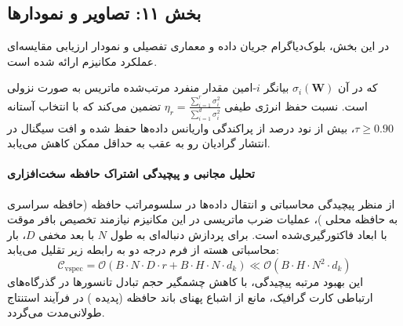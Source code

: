 \begin{center}
\end{center}

\subsection*{بخش ۱۱: تصاویر و نمودارها }
در این بخش، بلوک‌دیاگرام جریان داده و معماری تفصیلی و نمودار ارزیابی مقایسه‌ای عملکرد مکانیزم  ارائه شده است.



که در آن $\sigma_i(\mathbf{W})$ بیانگر $i$-امین مقدار منفرد مرتب‌شده ماتریس به صورت نزولی است. نسبت حفظ انرژی طیفی $\eta_r = \frac{\sum_{i=1}^r \sigma_i^2}{\sum_{i=1}^{d} \sigma_i^2}$ تضمین می‌کند که با انتخاب آستانه $\tau \ge 0.90$، بیش از نود درصد از پراکندگی واریانس داده‌ها حفظ شده و افت سیگنال در انتشار گرادیان رو به عقب به حداقل ممکن کاهش می‌یابد.

\paragraph{تحلیل مجانبی و پیچیدگی اشتراک حافظه سخت‌افزاری}
از منظر پیچیدگی محاسباتی و انتقال داده‌ها در سلسومراتب حافظه (حافظه سراسری  به حافظه محلی )، عملیات ضرب ماتریسی در این مکانیزم نیازمند تخصیص بافر موقت با ابعاد فاکتورگیری‌شده است. برای پردازش دنباله‌ای به طول $N$ با بعد مخفی $D$، بار محاسباتی هسته از فرم درجه دو به رابطه زیر تقلیل می‌یابد:
\begin{equation}
\label{eq:complexity_vspec}
\mathcal{C}_{\text{vspec}} = \mathcal{O}\left( B \cdot N \cdot D \cdot r + B \cdot H \cdot N \cdot d_k \right) \ll \mathcal{O}\left( B \cdot H \cdot N^2 \cdot d_k \right)
\end{equation}
این بهبود مرتبه پیچیدگی، با کاهش چشمگیر حجم تبادل تانسورها در گذرگاه‌های ارتباطی کارت گرافیک، مانع از اشباع پهنای باند حافظه (پدیده ) در فرآیند استنتاج طولانی‌مدت می‌گردد.